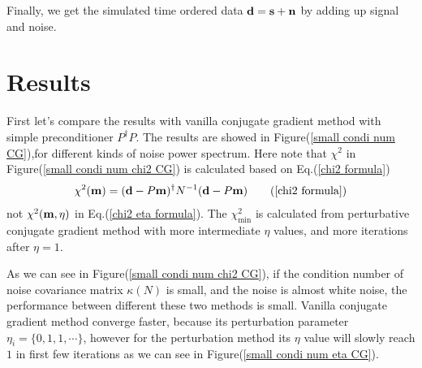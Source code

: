 \documentclass[11pt, letterpaper]{article}
\newcommand{\vbd}{\vb{d}}
\newcommand{\vbm}{\vb{m}}
\newcommand{\Pdagger}{P^{\dagger}}
\begin{document}
Finally, we get the simulated time ordered data $\vb{d} = \vb{s} + \vb{n}$ by
adding up signal and noise.

\section{Results}
First let's compare the results with vanilla conjugate gradient method with
simple preconditioner $\Pdagger P$.
The results are showed in Figure(\ref{small condi num CG}),for different kinds
of noise power spectrum.
Here note that $\chi^2$ in Figure(\ref{small condi num chi2 CG}) is calculated
based on Eq.(\ref{chi2 formula})
\begin{align}
\chi^2(\vbm) = (\vbd - P\vbm)^{\dagger} N^{-1} (\vbd - P \vbm)
\tag{\ref{chi2 formula}}
\end{align}
not $\chi^2(\vbm, \eta)$ in Eq.(\ref{chi2 eta formula}).
The $\chi^2_{\text{min}}$ is calculated from perturbative conjugate gradient
method with more intermediate $\eta$ values, and more iterations after
$\eta=1$.

As we can see in Figure(\ref{small condi num chi2 CG}), if the condition number
of noise covariance matrix $\kappa(N)$ is small, and the noise is almost white
noise, the performance between different these two methods is small.
Vanilla conjugate gradient method converge faster, because its perturbation
parameter $\eta_{i}=\{0,1,1,\cdots\}$, however for the perturbation method its
$\eta$ value will slowly reach $1$ in first few iterations as we can see in
Figure(\ref{small condi num eta CG}).
\end{document}

